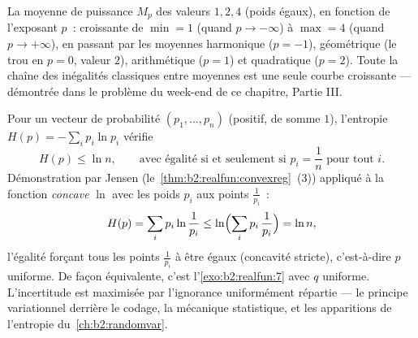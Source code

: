 \begin{omfigure}

{\small La moyenne de puissance $M_p$ des valeurs $1, 2, 4$ (poids
égaux), en fonction de l'exposant $p$~: croissante de $\min = 1$
(quand $p \to -\infty$) à $\max = 4$ (quand $p \to +\infty$), en
passant par les moyennes harmonique ($p = -1$), géométrique (le trou
en $p = 0$, valeur $2$), arithmétique ($p = 1$) et quadratique ($p
= 2$). Toute la chaîne des inégalités classiques entre moyennes est
une seule courbe croissante --- démontrée dans le problème du
week-end de ce chapitre, Partie III.}
\end{omfigure}

\begin{example}\label{ex:b2:realfun:entropy}
Pour un vecteur de probabilité $(p_1, \dots, p_n)$ (positif, de somme
$1$), l'entropie $H(p) = -\sum_i p_i\ln p_i$ vérifie
\[
H(p) \leq \ln n ,
\qquad\text{avec égalité si et seulement si } p_i = \frac1n
\text{ pour tout } i .
\]
Démonstration par Jensen (le~\cref{thm:b2:realfun:convexreg}~(3))
appliqué à la fonction \emph{concave} $\ln$ avec les poids $p_i$ aux
points $\frac{1}{p_i}$~:
\[
H(p) = \sum_i p_i\ln\frac{1}{p_i}
\leq \ln\Bigl(\sum_i p_i\,\frac1{p_i}\Bigr) = \ln n ,
\]
l'égalité forçant tous les points $\frac1{p_i}$ à être égaux
(concavité stricte), c'est-à-dire $p$ uniforme. De façon
équivalente, c'est l'\cref{exo:b2:realfun:7} avec $q$ uniforme.
L'incertitude est maximisée par l'ignorance uniformément répartie ---
le principe variationnel derrière le codage, la mécanique
statistique, et les apparitions de l'entropie du~\cref{ch:b2:randomvar}.
\end{example}

